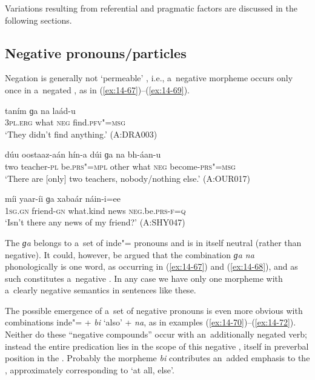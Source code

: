 Variations resulting from referential and pragmatic factors are discussed in the following sections.


\subsection{Negative pronouns/particles}
\label{subsec:14-3-2}

Negation is generally not `permeable' \citep[563]{ramat2006}, i.e., a~negative morpheme occurs only once in a~negated , as in (\ref{ex:14-67})--(\ref{ex:14-69}).

\begin{exe}
\ex
\label{ex:14-67}
\gll taním ɡa na laád-u \\
\textsc{3pl.erg} what \textsc{neg} find.\textsc{pfv"=msg}  \\
\glt `They didn't find anything.' (A:DRA003)

\ex
\label{ex:14-68}
\gll dúu oostaaz-aán hín-a dúi ɡa na  bh-áan-u \\
two teacher-\textsc{pl} be.\textsc{prs"=mpl} other what \textsc{neg}  become-\textsc{prs"=msg} \\
\glt `There are [only] two teachers, nobody/nothing else.' (A:OUR017)

\ex
\label{ex:14-69}
\gll míi yaar-íi ɡa xabaár náin-i=ee \\
\textsc{1sg.gn} friend-\textsc{gn} what.kind news \textsc{neg}.be.\textsc{prs-f=q}  \\
\glt `Isn't there any news of my friend?' (A:SHY047)
\end{exe}

The  \textit{ɡa} belongs to a~set of inde"= pronouns and is in itself neutral (rather than negative). It could, however, be argued that the combination \textit{ɡa na} phonologically is one word, as occurring in (\ref{ex:14-67}) and (\ref{ex:14-68}), and as such constitutes a~negative . In any case we have only one morpheme with a~clearly negative semantics in sentences like these. 



The possible emergence of a~set of negative pronouns is even more obvious with combinations inde"=  + \textit{bi} `also' + \textit{na}, as in examples (\ref{ex:14-70})--(\ref{ex:14-72}). Neither do these ``negative compounds'' occur with an~additionally negated verb; instead the entire predication lies in the scope of this negative , itself in preverbal position in the . Probably the morpheme \textit{bi} contributes an~added emphasis to the , approximately corresponding to `at all, else'.

